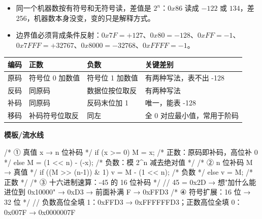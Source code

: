 \documentclass[10pt,a4paper]{ctexart}
\begin{document}
\begin{itemize}

\item 同一个机器数按有符号和无符号读，差值是 $2^n$：$0x86$ 读成 $-122$ 或 $134$，差 256，机器数本身没变，变的只是解释方式。

\item 边界值必须背成条件反射：$0x7F=+127$、$0x80=-128$、$0xFF=-1$、$0x7FFF=+32767$、$0x8000=-32768$、$0xFFFF=-1$。

\end{itemize}

\begin{center}\small
\begin{tabularx}{\linewidth}{@{}cll>{\raggedright\arraybackslash}X@{}}
\toprule
编码 & 正数 & 负数 & 关键差别 \\
\midrule
原码 & 符号位 0 加数值 & 符号位 1 加数值 & 0 有两种写法，表不出 -128 \\
反码 & 同原码 & 数据位按位取反 & 0 有两种写法 \\
补码 & 同原码 & 反码末位加 1 & 0 唯一，能表 -128 \\
移码 & 补码符号位取反 & 同左 & 全 0 对应最小值，常用于阶码 \\
\bottomrule
\end{tabularx}
\end{center}


\textbf{模板/流水线}

\begin{codebox}
/* ① 真值 x → n 位补码 */
if (x >= 0) M = x;                     /* 正数：原码即补码，高位补 0 */
else        M = (1 << n) - (-x);        /* 负数：模 2^n 减去绝对值 */
/* ② n 位补码 M → 真值 */
if ((M >> (n-1)) & 1) v = M - (1 << n); /* 负数 */
else                  v = M;            /* 正数 */
/* ③ 十六进制速算：-45 的 16 位补码 */
// 45 = 0x2D → 想"加什么能进位到 0x10000" → 0xD3 → 前面补满 F → 0xFFD3
/* ④ 符号扩展：16 位 → 32 位 */
// 负数高位全填 1：0xFFD3 → 0xFFFFFFD3；正数高位全填 0：0x007F → 0x0000007F
\end{codebox}


\end{document}
